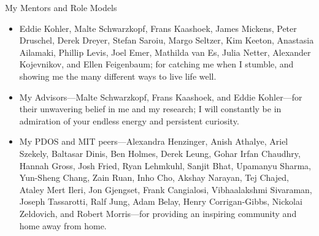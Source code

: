 \begin{center}{My Mentors and Role Models}\end{center} 
    \begin{itemize} 
        \item Eddie Kohler, Malte Schwarzkopf, Frans Kaashoek, James
                Mickens, Peter Druschel, Derek Dreyer, Stefan Saroiu, Margo
                Seltzer, Kim Keeton, Anastasia Ailamaki, Phillip Levis, Joel
                Emer, Mathilda van Es, Julia Netter, Alexander Kojevnikov, and
                Ellen Feigenbaum; for catching me when I stumble, and showing me
                the many different ways to live life well.

        \item My Advisors---Malte Schwarzkopf, Frans Kaashoek, and Eddie
            Kohler---for their unwavering belief in me and my research; I will
            constantly be in admiration of your endless energy and persistent
            curiosity.

        \item My PDOS and MIT peers---Alexandra Henzinger, Anish Athalye,
            Ariel Szekely, Baltasar Dinis, Ben Holmes, Derek Leung, Gohar Irfan
            Chaudhry, Hannah Gross, Josh Fried, Ryan Lehmkuhl, Sanjit Bhat,
            Upamanyu Sharma, Yun-Sheng Chang, Zain Ruan, Inho Cho, Akshay
            Narayan, Tej Chajed, Ataley Mert Ileri, Jon Gjengset, Frank
            Cangialosi, Vibhaalakshmi Sivaraman, Joseph Tassarotti, Ralf Jung,
            Adam Belay, Henry Corrigan-Gibbs, Nickolai Zeldovich, and Robert
            Morris---for providing an inspiring community and home away from home.
    \end{itemize}
    
